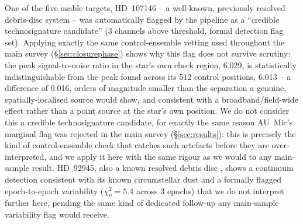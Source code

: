 \documentclass{openjournal}
\begin{document}
One of the five usable targets, HD~107146 -- a well-known, previously
resolved debris-disc system \citep{Ardila2004} -- was automatically
flagged by the pipeline as a ``credible technosignature candidate'' (3
channels above threshold, formal detection flag set). Applying exactly
the same control-ensemble vetting used throughout the main survey
(\S\ref{sec:closurephase}) shows why this flag does not survive scrutiny:
the peak signal-to-noise ratio in the star's own check region, 6.029, is
statistically indistinguishable from the peak found across its 512
control positions, 6.013 -- a difference of 0.016, orders of magnitude
smaller than the separation a genuine, spatially-localised source would
show, and consistent with a broadband/field-wide effect rather than a
point source at the star's own position. We do not consider this a
credible technosignature candidate, for exactly the same reason AU~Mic's
marginal flag was rejected in the main survey (\S\ref{sec:results}):
this is precisely the kind of control-ensemble check that catches such
artefacts before they are over-interpreted, and we apply it here with
the same rigour as we would to any main-sample result. HD~92945, also a
known resolved debris disc \citep{Golimowski2011}, shows a continuum
detection consistent with its known circumstellar dust and a formally
flagged epoch-to-epoch variability ($\chi^2_\nu=5.4$ across 3 epochs)
that we do not interpret further here, pending the same kind of
dedicated follow-up any main-sample variability flag would receive.
\end{document}
